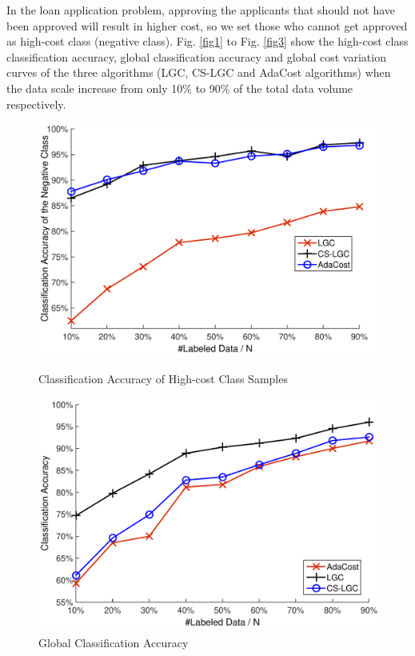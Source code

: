 \documentclass{svjour3}                     %
\begin{document}
In the loan application problem, approving the applicants that should not have been approved will result in higher cost, so we set those who cannot get approved as high-cost class (negative class). Fig. \ref{fig1} to Fig. \ref{fig3} show the high-cost class classification accuracy, global classification accuracy and global cost variation curves of the three algorithms (LGC, CS-LGC and AdaCost algorithms) when the data scale increase from only 10\% to 90\% of the total data volume respectively.
\begin{figure}[H]
\begin{minipage}[t]{.5\textwidth}
\includegraphics[width=\textwidth]{plot/fig1.pdf}
\caption{Classification Accuracy of High-cost Class Samples} \label{fig1}
\end{minipage}
\begin{minipage}[t]{.5\textwidth}
\includegraphics[width=\textwidth]{plot/fig2.pdf}
\caption{Global Classification Accuracy} \label{fig2}
\end{minipage}
\end{figure}
\end{document}
